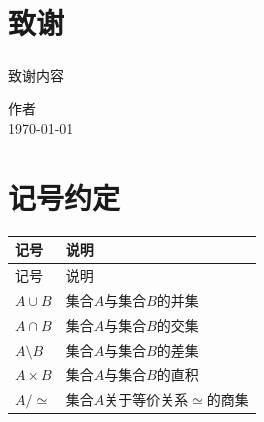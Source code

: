 ﻿\documentclass{sysuthesis}
\begin{document}
\appendix

\chapter*{致谢}

\songti{}
\paragraph{}致谢内容

\vskip 18pt
\begin{flushright}
作者\\
\today
\end{flushright}

\chapter{记号约定}
\songti{}
\begin{longtable}{ll}
记号 & 说明\\
\endfirsthead
记号 & 说明\\
\endhead
\endfoot
\endlastfoot
$A \cup B$ & 集合$A$与集合$B$的并集\\
$A \cap B$ & 集合$A$与集合$B$的交集\\
$A \setminus B$ & 集合$A$与集合$B$的差集\\
$A \times B$ & 集合$A$与集合$B$的直积\\
$A / \simeq$ & 集合$A$关于等价关系$\simeq$的商集\\
\end{longtable}

\backmatter

\end{document}
